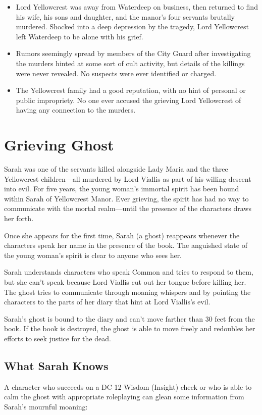 \documentclass[10pt,a4paper,twoside,bg=print,twocolumn,openany,nodeprecatedcode]{dndbook}
\begin{document}
\begin{itemize}
\item Lord Yellowcrest was away from Waterdeep on business, then returned to find his wife, his sons and daughter, and the manor's four servants brutally murdered. Shocked into a deep depression by the tragedy, Lord Yellowcrest left Waterdeep to be alone with his grief.
\item Rumors seemingly spread by members of the City Guard after investigating the murders hinted at some sort of cult activity, but details of the killings were never revealed. No suspects were ever identified or charged.
\item The Yellowcrest family had a good reputation, with no hint of personal or public impropriety. No one ever accused the grieving Lord Yellowcrest of having any connection to the murders.
\end{itemize}

\section{Grieving Ghost}
Sarah was one of the servants killed alongside Lady Maria and the three Yellowcrest children—all murdered by Lord Viallis as part of his willing descent into evil. For five years, the young woman's immortal spirit has been bound within Sarah of Yellowcrest Manor. Ever grieving, the spirit has had no way to communicate with the mortal realm—until the presence of the characters draws her forth.

Once she appears for the first time, Sarah (a ghost) reappears whenever the characters speak her name in the presence of the book. The anguished state of the young woman's spirit is clear to anyone who sees her.

Sarah understands characters who speak Common and tries to respond to them, but she can't speak because Lord Viallis cut out her tongue before killing her. The ghost tries to communicate through moaning whispers and by pointing the characters to the parts of her diary that hint at Lord Viallis's evil.

Sarah's ghost is bound to the diary and can't move farther than 30 feet from the book. If the book is destroyed, the ghost is able to move freely and redoubles her efforts to seek justice for the dead.

\subsection{What Sarah Knows}
A character who succeeds on a DC 12 Wisdom (Insight) check or who is able to calm the ghost with appropriate roleplaying can glean some information from Sarah's mournful moaning:
\end{document}
